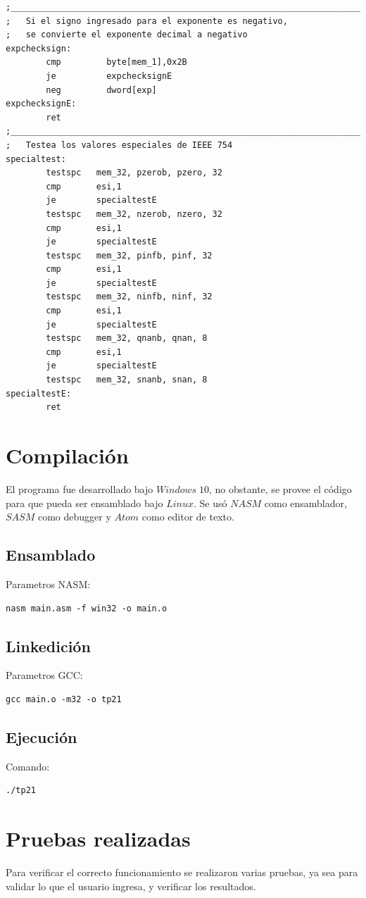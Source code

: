 \documentclass{article}
\begin{document}
\begin{verbatim}
;_______________________________________________________________________
;   Si el signo ingresado para el exponente es negativo,
;   se convierte el exponente decimal a negativo
expchecksign:
        cmp         byte[mem_1],0x2B
        je          expchecksignE
        neg         dword[exp]
expchecksignE:
        ret
;______________________________________________________________________
;   Testea los valores especiales de IEEE 754
specialtest:
        testspc   mem_32, pzerob, pzero, 32
        cmp       esi,1
        je        specialtestE
        testspc   mem_32, nzerob, nzero, 32
        cmp       esi,1
        je        specialtestE
        testspc   mem_32, pinfb, pinf, 32
        cmp       esi,1
        je        specialtestE
        testspc   mem_32, ninfb, ninf, 32
        cmp       esi,1
        je        specialtestE
        testspc   mem_32, qnanb, qnan, 8
        cmp       esi,1
        je        specialtestE
        testspc   mem_32, snanb, snan, 8
specialtestE:
        ret

	\end{verbatim}

\newpage
\section{Compilación}
El programa fue desarrollado bajo $Windows \; 10$, no obstante, se provee el código para que pueda ser ensamblado bajo $Linux$. Se usó $NASM$ como ensamblador, $SASM$ como debugger y $Atom$ como editor de texto.
\subsection{Ensamblado}
Parametros NASM:
\begin{verbatim}
nasm main.asm -f win32 -o main.o
\end{verbatim}
\subsection{Linkedición}
Parametros GCC:
\begin{verbatim}
gcc main.o -m32 -o tp21
\end{verbatim}
\subsection{Ejecución}
Comando:
\begin{verbatim}
./tp21
\end{verbatim}


\newpage
\section{Pruebas realizadas}
Para verificar el correcto funcionamiento se realizaron varias pruebas, ya sea para validar lo que el usuario ingresa, y verificar los resultados.
\end{document}
